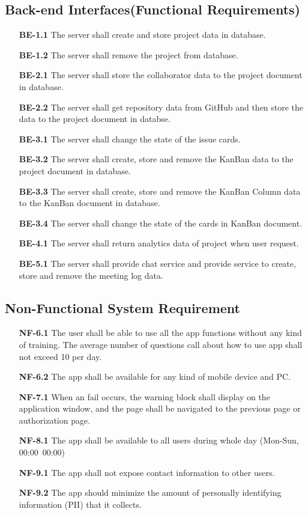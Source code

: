 \documentclass[12pt,a4paper]{report}
\begin{document}
	\subsection{Back-end Interfaces(Functional Requirements)}
			\begin{enumerate}
				\item[\textbf{BE-1.1}] The server shall create and store project data in database.
				\item[\textbf{BE-1.2}] The server shall remove the project from database.
				\item[\textbf{BE-2.1}] The server shall store the collaborator data to the project document in database.
				\item[\textbf{BE-2.2}] The server shall get repository data from GitHub and then store the data to the project document in databse.
				\item[\textbf{BE-3.1}] The server shall change the state of the issue cards.
				\item[\textbf{BE-3.2}] The server shall create, store and remove the KanBan data to the project document in database.
				\item[\textbf{BE-3.3}] The server shall create, store and remove the KanBan Column data to the KanBan document in database.
				\item[\textbf{BE-3.4}] The server shall change the state of the cards in KanBan document.
				\item[\textbf{BE-4.1}] The server shall return analytics data of project when user request.
				\item[\textbf{BE-5.1}] The server shall provide chat service and provide service to create, store and remove the meeting log data.
			\end{enumerate}
	\subsection{Non-Functional System Requirement}
		\begin{enumerate}
			\item[\textbf{NF-6.1}] The user shall be able to use all the app functions without any kind of training. The average number of questions call about how to use app shall not exceed 10 per day.
			\item[\textbf{NF-6.2}] The app shall be available for any kind of mobile device and PC.
			\item[\textbf{NF-7.1}] When an fail occurs, the warning block shall display on the application window, and the page shall be navigated to the previous page or authorization page.
			\item[\textbf{NF-8.1}] The app shall be available to all users during whole day (Mon-Sun, 00:00~00:00)
			\item[\textbf{NF-9.1}] The app shall not expose contact information to other users. 
			\item[\textbf{NF-9.2}] The app should minimize the amount of personally identifying information (PII) that it collects.
		\end{enumerate}
	
\end{document}
